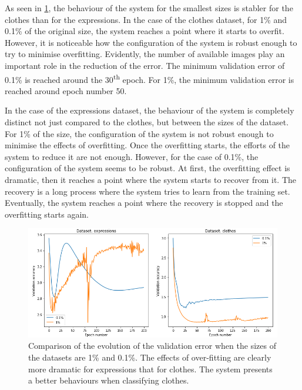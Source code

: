 \documentclass{article}
\begin{document}
As seen in \ref{fig:tf_beh}, the behaviour of the system for the smallest sizes is stabler for the clothes than for the expressions. In the case of the clothes dataset, for 1\% and 0.1\% of the original size, the system reaches a point where it starts to overfit. However, it is noticeable how the configuration of the system is robust enough to try to minimise overfitting. Evidently, the number of available images play an important role in the reduction of the error. The minimum validation error of 0.1\% is reached around the 30\textsuperscript{th} epoch. For 1\%, the minimum validation error is reached around epoch number 50.

In the case of the expressions dataset, the behaviour of the system is completely distinct not just compared to the clothes, but between the sizes of the dataset. For 1\% of the size, the configuration of the system is not robust enough to minimise the effects of overfitting. Once the overfitting starts, the efforts of the system to reduce it are not enough. However, for the case of 0.1\%, the configuration of the system seems to be robust.  At first, the overfitting effect is dramatic, then it reaches a point where the system starts to recover from it. The recovery is a long process where the system tries to learn from the training set. Eventually, the system reaches a point where the recovery is stopped and the overfitting starts again.

\begin{figure}[tb]
    \vskip 5mm
        \begin{center}
            \includegraphics[scale=0.4]{behaviour_rotated.png}
            \caption{Comparison of the evolution of the validation error when the sizes of the datasets are 1\% and 0.1\%. The effects of over-fitting are clearly more dramatic for expressions that for clothes. The system presents a better behaviours when classifying clothes. }
            \label{fig:tf_beh}
        \end{center}
    \vskip -5mm
\end{figure}
\end{document}
